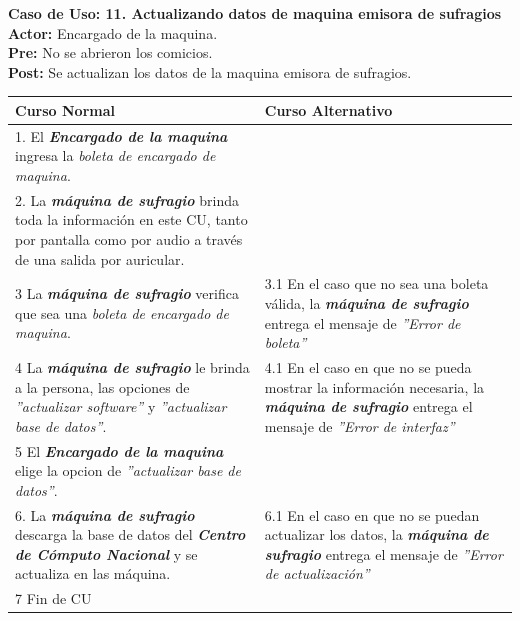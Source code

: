 \documentclass[spanish, 10pt,a4paper]{article}
\numberwithin{equation}{section} %
\begin{document}
\noindent\textbf{Caso de Uso: 11. Actualizando datos de maquina emisora de sufragios}\\
\textbf{Actor: } Encargado de la maquina.\\
\textbf{Pre: } No se abrieron los comicios.\\
\textbf{Post: } Se actualizan los datos de la maquina emisora de sufragios.\\
\begin{table}[H]
  \centering
\bgroup
\def\arraystretch{1.3}
  \begin{tabular}{p{9cm} | p{7cm}}
    \hline
    Curso Normal & Curso Alternativo \\
    \hline
    \hline    
    1. El \textbf{\textit{Encargado de la maquina}} ingresa la \textit{boleta de encargado de maquina}. 
    & \\
    
    \hline
    2. La \textbf{\textit{máquina de sufragio}} brinda toda la información en este CU, tanto por pantalla como por audio a través de una salida por auricular.
    &
    \\
    
    \hline
    3 La \textbf{\textit{máquina de sufragio}} verifica que sea una \textit{boleta de encargado de maquina}.
    & 
    3.1 En el caso que no sea una boleta válida, la \textbf{\textit{máquina de sufragio}} entrega el mensaje de \textit{''Error de boleta''}
    \\
    
    \hline
    4 La \textbf{\textit{máquina de sufragio}} le brinda a la persona, las opciones de \textit{''actualizar software''} y \textit{''actualizar base de datos''}.
    & 
    4.1 En el caso en que no se pueda mostrar la información necesaria, la \textbf{\textit{máquina de sufragio}} entrega el mensaje de \textit{''Error de interfaz''}
    \\
    
    \hline
    5 El \textbf{\textit{Encargado de la maquina}} elige la opcion de \textit{''actualizar base de datos''}.
    & \\
    
    \hline
    6. La \textbf{\textit{máquina de sufragio}} descarga la base de datos del \textbf{\textit{Centro de Cómputo Nacional}} y se actualiza en las máquina.
    &
    6.1 En el caso en que no se puedan actualizar los datos, la \textbf{\textit{máquina de sufragio}} entrega el mensaje de \textit{''Error de actualización''}
    \\
    
    \hline
    7 Fin de CU
    & \\
    \hline
  \end{tabular}
\egroup
\end{table}
\end{document}
